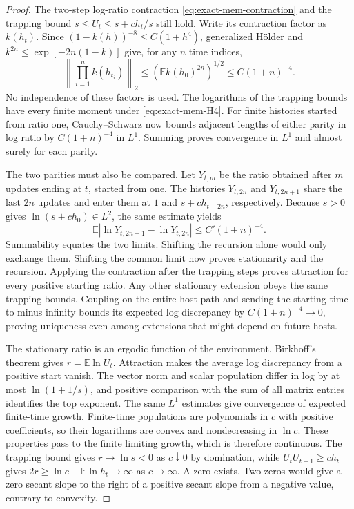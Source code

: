 \begin{proof}
The two-step log-ratio contraction \eqref{eq:exact-mem-contraction}
and the trapping bound $s\leq U_t\leq s+c h_t/s$ still hold.
Write its contraction factor as $k(h_t)$. Since
$(1-k(h))^{-8}\leq C(1+h^4)$, generalized H\"older and
$k^{2n}\leq\exp[-2n(1-k)]$ give, for any $n$ time indices,
\begin{equation}
 \left\|\prod_{i=1}^n k(h_{t_i})\right\|_2
 \leq(\mathbb E k(h_0)^{2n})^{1/2}
 \leq C(1+n)^{-4}.
 \label{eq:exact-mem-unbounded-contraction}
\end{equation}
No independence of these factors is used. The logarithms of the
trapping bounds have every finite moment under \eqref{eq:exact-mem-H4}.
For finite histories started from ratio one, Cauchy--Schwarz now
bounds adjacent lengths of either parity in log ratio by
$C(1+n)^{-4}$ in $L^1$. Summing proves convergence in $L^1$ and
almost surely for each parity.

The two parities must also be compared. Let $Y_{t,m}$ be the ratio
obtained after $m$ updates ending at $t$, started from one.
The histories $Y_{t,2n}$ and $Y_{t,2n+1}$ share the last $2n$
updates and enter them at $1$ and $s+c h_{t-2n}$, respectively.
Because $s>0$ gives $\ln(s+c h_0)\in L^2$, the same estimate yields
\begin{equation}
 \mathbb E|\ln Y_{t,2n+1}-\ln Y_{t,2n}|
 \leq C'(1+n)^{-4}.
 \label{eq:exact-mem-parity-fix}
\end{equation}
Summability equates the two limits. Shifting the recursion alone
would only exchange them. Shifting the common limit now proves
stationarity and the recursion. Applying the contraction after the
trapping steps proves attraction for every positive starting ratio.
Any other stationary extension obeys the same trapping bounds.
Coupling on the entire host path and sending the starting time to
minus infinity bounds its expected log discrepancy by
$C(1+n)^{-4}\to0$, proving uniqueness even among extensions that
might depend on future hosts.

The stationary ratio is an ergodic function of the environment.
Birkhoff's theorem gives $r=\mathbb E\ln U_t$.
Attraction makes the average log discrepancy from a positive start
vanish. The vector norm and scalar population differ in log by at
most $\ln(1+1/s)$, and positive comparison with the sum of all matrix
entries identifies the top exponent. The same $L^1$ estimates give
convergence of expected finite-time growth.
Finite-time populations are polynomials in $c$ with positive
coefficients, so their logarithms are convex and nondecreasing in
$\ln c$. These properties pass to the finite limiting growth,
which is therefore continuous. The trapping bound gives
$r\to\ln s<0$ as $c\downarrow0$ by domination, while
$U_tU_{t-1}\geq c h_t$ gives
$2r\geq\ln c+\mathbb E\ln h_t\to\infty$ as $c\to\infty$.
A zero exists. Two zeros would give a zero secant slope to the right
of a positive secant slope from a negative value, contrary to convexity.
\end{proof}

